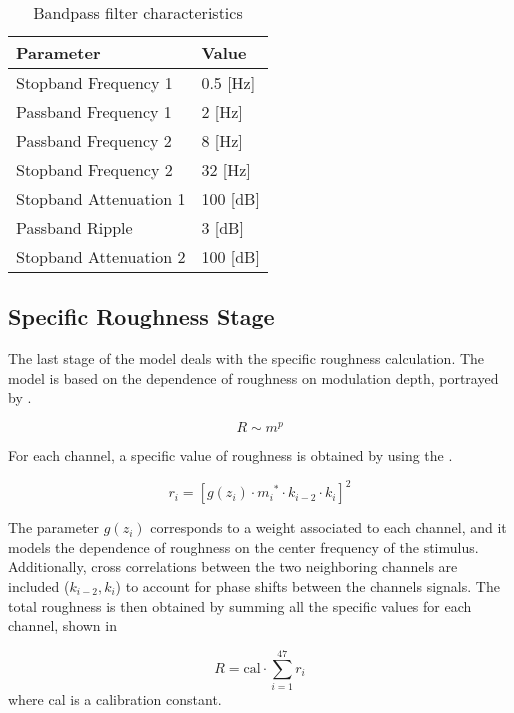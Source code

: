 \documentclass[../main.tex]{subfiles}
\begin{document}
\begin{modelchapter}
\begin{table}[!ht]
  \centering
  \begin{tabu} to \linewidth{XX}
    \toprule
    \rowfont\bfseries
    Parameter & Value \\
    \midrule
    Stopband Frequency 1 & 0.5 [Hz] \\
    Passband Frequency 1 & 2 [Hz] \\
    Passband Frequency 2 & 8 [Hz] \\
    Stopband Frequency 2 & 32 [Hz] \\
    Stopband Attenuation 1 & 100 [dB] \\
    Passband Ripple & 3 [dB] \\
    Stopband Attenuation 2 & 100 [dB] \\
    \bottomrule
  \end{tabu}
  \caption{Bandpass filter characteristics}
\label{tab:bandpass_filter}
\end{table}

\subsection{Specific Roughness Stage}

The last stage of the model deals with the specific roughness calculation. The
model is based on the dependence of roughness on modulation depth, portrayed
by .

\begin{equation}
  R \sim m^p
  \label{eq:roughness_modulation_depth}
\end{equation}

For each channel, a specific value of roughness is obtained by using the
.

\begin{equation}
  r_i = [g(z_i) \cdot {m_i}^* \cdot k_{i-2} \cdot k_i]^2
  \label{eq:ri}
\end{equation}

The parameter $g(z_i)$ corresponds to a weight associated to each channel, and
it models the dependence of roughness on the center frequency of the stimulus.
Additionally, cross correlations between the two neighboring channels are
included ($k_{i-2}, k_i$) to account for phase shifts between the channels
signals. The total roughness is then obtained by summing all the specific
values for each channel, shown in 

\begin{equation}
  R = \text{cal} \cdot \displaystyle\sum_{i=1}^{47} r_i
  \label{eq:total_roughness}
\end{equation}
where cal is a calibration constant.


\end{modelchapter}
\end{document}
